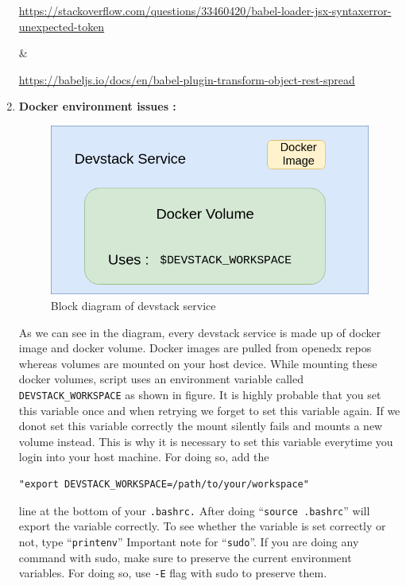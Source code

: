 \begin{enumerate}
\begin{small}\url {https://stackoverflow.com/questions/33460420/babel-loader-jsx-syntaxerror-unexpected-token}\end{small} \& \newline
\begin{small}\url{https://babeljs.io/docs/en/babel-plugin-transform-object-rest-spread}\end{small}
	\item \textbf{Docker environment issues :} \newline
	\begin{figure}
		\includegraphics[width=\linewidth]{images/devstack_arch.png}
		\caption{Block diagram of devstack service}
	\end{figure}
As we can see in the diagram, every devstack service is made up of docker image and docker
volume. Docker images are pulled from openedx repos whereas volumes are mounted on your host
device. While mounting these docker volumes, script uses an environment variable called 
\verb=DEVSTACK_WORKSPACE= as shown in figure. It is highly probable that you set this variable
once and when retrying we forget to set this variable again. If we donot set this variable correctly
the mount silently fails and mounts a new volume instead. This is why it is necessary to set this
variable everytime you login into your host machine. For doing so, add the 
	\begin{center}
	\begin{verbatim}"export DEVSTACK_WORKSPACE=/path/to/your/workspace"
	\end{verbatim}
	\end{center} line at the bottom of your \verb=.bashrc.=
After doing “\verb=source .bashrc=” will export the variable correctly. To see whether the variable is set
correctly or not, type “\verb=printenv=”\newline
Important note for “\verb=sudo=”. If you are doing any command with sudo, make sure to preserve the
current environment variables. For doing so, use \verb=-E= flag with sudo to preserve them.
\end{enumerate}

